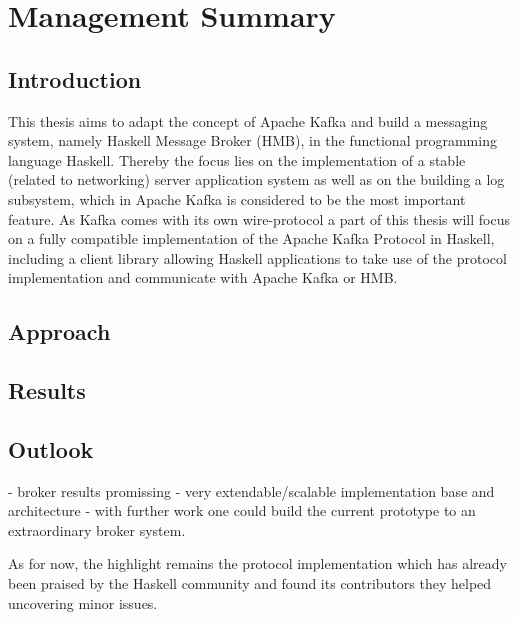 \chapter{Management Summary}

\section{Introduction}

This thesis aims to adapt the concept of Apache Kafka and build a messaging
system, namely Haskell Message Broker (HMB), in the functional programming
language Haskell. Thereby the focus lies on the implementation of a stable
(related to networking) server application system as well as on the building a
log subsystem, which in Apache Kafka is considered to be the most important
feature. As Kafka comes with its own wire-protocol a part of this thesis will
focus on a fully compatible implementation of the Apache Kafka Protocol in
Haskell, including a client library allowing Haskell applications to take use of
the protocol implementation and communicate with Apache Kafka or HMB.

\section{Approach}

\section{Results}

\section{Outlook}

- broker results promissing
- very extendable/scalable implementation base and architecture
- with further work one could build the current prototype to an extraordinary
broker system.

As for now, the highlight remains the protocol implementation which has already
been praised by the Haskell community and found its contributors they helped
uncovering minor issues.
